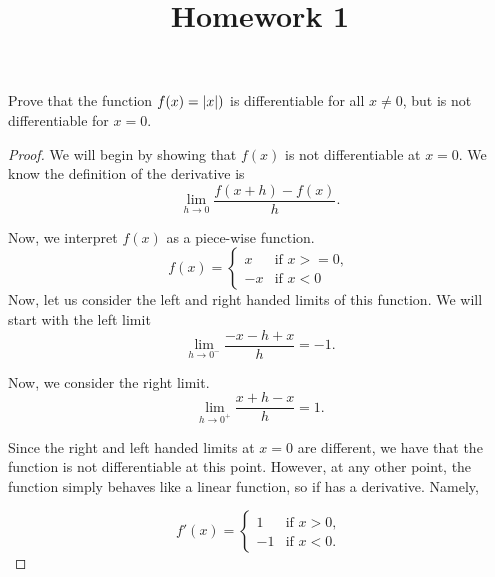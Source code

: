 \documentclass{article}
\title{Homework 1}
\begin{document}
\maketitle

    Prove that the function $f(x) = \abs{x})$ is differentiable for all $x \neq 0$, but is not differentiable for $x = 0$.

    \begin{proof}
        We will begin by showing that $f(x)$ is not differentiable at $x = 0$. We know the definition of the derivative is
        \begin{equation*}
            \lim_{h \to 0} \frac{f(x + h) - f(x)}{h}.
        \end{equation*}

        Now, we interpret $f(x)$ as a piece-wise function.
        \begin{equation*}
            f(x) = \begin{cases}
                x & \text{if } x >= 0,\\
                -x & \text{if } x < 0
                \end{cases}
        \end{equation*}
        Now, let us consider the left and right handed limits of this function. We will start with the left limit
        \begin{equation*}
            \lim_{h \to 0^{-}} \frac{-x - h + x}{h} = -1.
        \end{equation*}

        Now, we consider the right limit.
        \begin{equation*}
            \lim_{h \to 0^{+}} \frac{x + h -x}{h} = 1.
        \end{equation*}

        Since the right and left handed limits at $x = 0$ are different, we have that the function is not differentiable at 
        this point. However, at any other point, the function simply behaves like a linear function, so if has a derivative.
        Namely,

        \begin{equation*}
            f '(x) = \begin{cases}
                1 & \text{if } x > 0,\\
                -1 & \text{if } x < 0.
                \end{cases}
        \end{equation*}
    \end{proof}
\end{document}
